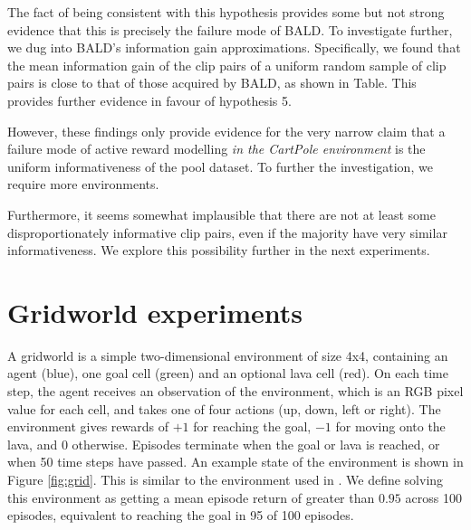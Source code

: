 \documentclass[11pt, a4paper, bibliography=totoc]{report}
\begin{document}
The fact of being consistent with this hypothesis provides some but not strong evidence that this is precisely the failure mode of BALD. To investigate further, we dug into BALD's information gain approximations. Specifically, we found that the mean information gain of the clip pairs of a uniform random sample of clip pairs is close to that of those acquired by BALD, as shown in Table. This provides further evidence in favour of hypothesis 5. %

However, these findings only provide evidence for the very narrow claim that a failure mode of active reward modelling \textit{in the CartPole environment} is the uniform informativeness of the pool dataset. To further the investigation, we require more environments.

Furthermore, it seems somewhat implausible that there are not at least some disproportionately informative clip pairs, even if the majority have very similar informativeness. We explore this possibility further in the next experiments.

\section{Gridworld experiments}
A gridworld is a simple two-dimensional environment of size 4x4, containing an agent (blue), one goal cell (green) and an optional lava cell (red). On each time step, the agent receives an observation of the environment, which is an RGB pixel value for each cell, and takes one of four actions (up, down, left or right). The environment gives rewards of $ +1 $ for reaching the goal, $ -1 $ for moving onto the lava, and $ 0 $ otherwise. Episodes terminate when the goal or lava is reached, or when 50 time steps have passed. An example state of the environment is shown in Figure \ref{fig:grid}. This is similar to the environment used in \cite{kenton2019generalizing}. We define solving this environment as getting a mean episode return of greater than $ 0.95 $ across 100 episodes, equivalent to reaching the goal in 95 of 100 episodes.
\end{document}
